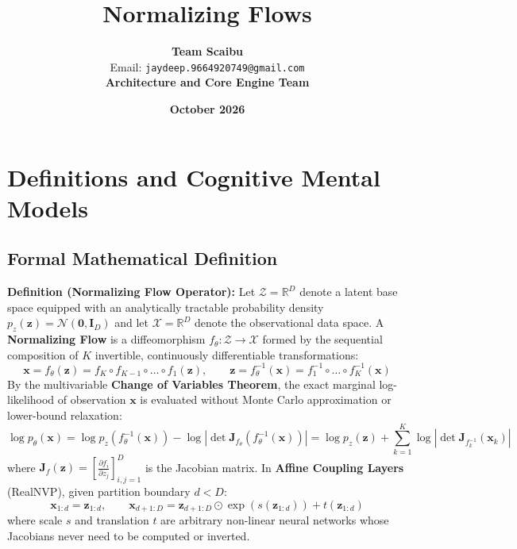 \documentclass[11pt,a4paper]{article}
\title{\textbf{Normalizing Flows}}
\author{\textbf{Team Scaibu} \\ \small Email: \texttt{jaydeep.9664920749@gmail.com} \\ \small \textbf{Architecture and Core Engine Team}}
\date{\textbf{October 2026}}
\theoremstyle{definition}
\begin{document}
\maketitle

\section{Definitions and Cognitive Mental Models}

\subsection{Formal Mathematical Definition}
\textbf{Definition (Normalizing Flow Operator):}
Let $\mathcal{Z} = \mathbb{R}^D$ denote a latent base space equipped with an analytically tractable probability density $p_z(\mathbf{z}) = \mathcal{N}(\mathbf{0}, \mathbf{I}_D)$ and let $\mathcal{X} = \mathbb{R}^D$ denote the observational data space. A \textbf{Normalizing Flow} is a diffeomorphism $f_\theta: \mathcal{Z} \to \mathcal{X}$ formed by the sequential composition of $K$ invertible, continuously differentiable transformations:
{\boldmath
\begin{equation}
\mathbf{x} = f_\theta(\mathbf{z}) = f_K \circ f_{K-1} \circ \dots \circ f_1(\mathbf{z}), \qquad \mathbf{z} = f_\theta^{-1}(\mathbf{x}) = f_1^{-1} \circ \dots \circ f_K^{-1}(\mathbf{x})
\end{equation}
}
By the multivariable \textbf{Change of Variables Theorem}, the exact marginal log-likelihood of observation $\mathbf{x}$ is evaluated without Monte Carlo approximation or lower-bound relaxation:
{\boldmath
\begin{equation}
\log p_\theta(\mathbf{x}) = \log p_z(f_\theta^{-1}(\mathbf{x})) - \log \left| \det \mathbf{J}_{f_\theta}(f_\theta^{-1}(\mathbf{x})) \right| = \log p_z(\mathbf{z}) + \sum_{k=1}^K \log \left| \det \mathbf{J}_{f_k^{-1}}(\mathbf{x}_{k}) \right|
\end{equation}
}
where $\mathbf{J}_f(\mathbf{z}) = \left[ \frac{\partial f_i}{\partial z_j} \right]_{i, j=1}^D$ is the Jacobian matrix. In \textbf{Affine Coupling Layers} (RealNVP), given partition boundary $d < D$:
{\boldmath
\begin{equation}
\mathbf{x}_{1:d} = \mathbf{z}_{1:d}, \qquad \mathbf{x}_{d+1:D} = \mathbf{z}_{d+1:D} \odot \exp(s(\mathbf{z}_{1:d})) + t(\mathbf{z}_{1:d})
\end{equation}
}
where scale $s$ and translation $t$ are arbitrary non-linear neural networks whose Jacobians never need to be computed or inverted.
\end{document}
